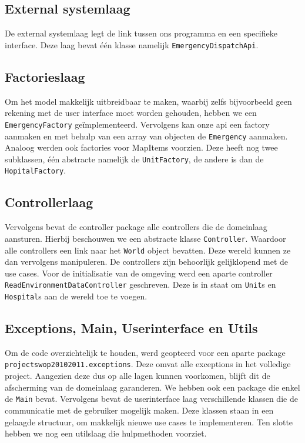 \subsection{External systemlaag}
De external systemlaag legt de link tussen ons programma en een specifieke interface. Deze laag bevat \'e\'en klasse namelijk \texttt{EmergencyDispatchApi}.
\subsection{Factorieslaag}
Om het model makkelijk uitbreidbaar te maken, waarbij zelfs bijvoorbeeld geen rekening met de user interface moet worden gehouden, hebben we een \texttt{EmergencyFactory} ge\"implementeerd. Vervolgens kan onze api een factory aanmaken en met behulp van een array van objecten de \texttt{Emergency} aanmaken. Analoog werden ook factories voor MapItems voorzien. Deze heeft nog twee subklassen, \'e\'en abstracte namelijk de \texttt{UnitFactory}, de andere is dan de \texttt{HopitalFactory}. 
\subsection{Controllerlaag}
Vervolgens bevat de controller package alle controllers die de domeinlaag aansturen. Hierbij beschouwen we een abstracte klasse \texttt{Controller}. Waardoor alle controllers een link naar het \texttt{World} object bevatten. Deze wereld kunnen ze dan vervolgens manipuleren. De controllers zijn behoorlijk gelijklopend met de use cases. Voor de initialisatie van de omgeving werd een aparte controller \texttt{ReadEnvironmentDataController} geschreven. Deze is in staat om \texttt{Unit}s en \texttt{Hospital}s aan de wereld toe te voegen.
\subsection{Exceptions, Main, Userinterface en Utils}
Om de code overzichtelijk te houden, werd geopteerd voor een aparte package \texttt{projectswop20102011.\-exceptions}. Deze omvat alle exceptions in het volledige project. Aangezien deze dus op alle lagen kunnen voorkomen, blijft dit de afscherming van de domeinlaag garanderen. We hebben ook een package die enkel de \texttt{Main} bevat. Vervolgens bevat de userinterface laag verschillende klassen die de communicatie met de gebruiker mogelijk maken. Deze klassen staan in een gelaagde structuur, om makkelijk nieuwe use cases te implementeren. Ten slotte hebben we nog een utilslaag die hulpmethoden voorziet.